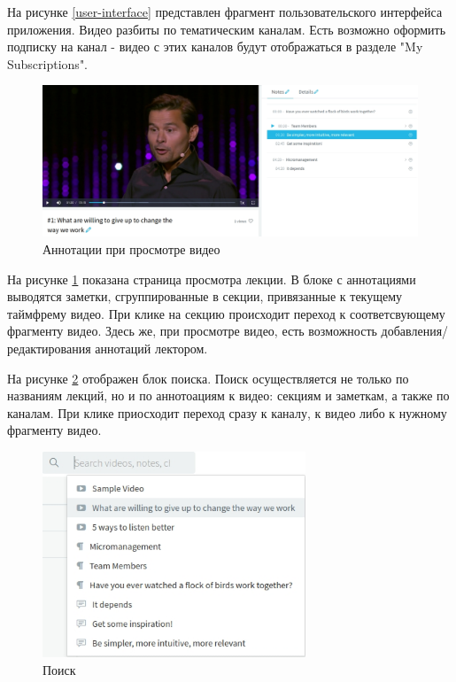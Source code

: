 На рисунке \ref{user-interface} представлен фрагмент пользовательского интерфейса приложения.
Видео разбиты по тематическим каналам. Есть возможно оформить подписку на канал - видео с этих
каналов будут отображаться в разделе "My Subscriptions".

\begin{figure}
  \centering
  \includegraphics[width=1\textwidth]{images/annotations.jpg}
  \caption{Аннотации при просмотре видео}\label{annotations}
\end{figure}

На рисунке \ref{annotations} показана страница просмотра лекции. В блоке с аннотациями
выводятся заметки, сгруппированные в секции, привязанные к текущему таймфрему видео.
При клике на секцию происходит переход к соответсвующему фрагменту видео. Здесь же, при просмотре
видео, есть возможность добавления/редактирования аннотаций лектором.

На рисунке \ref{search} отображен блок поиска. Поиск осуществляется не только по названиям лекций,
но и по аннотоациям к видео: секциям и заметкам, а также по каналам. При клике приосходит переход
сразу к каналу, к видео либо к нужному фрагменту видео.

\begin{figure}
  \centering
  \includegraphics[width=0.7\textwidth]{images/search.jpg}
  \caption{Поиск}\label{search}
\end{figure}

